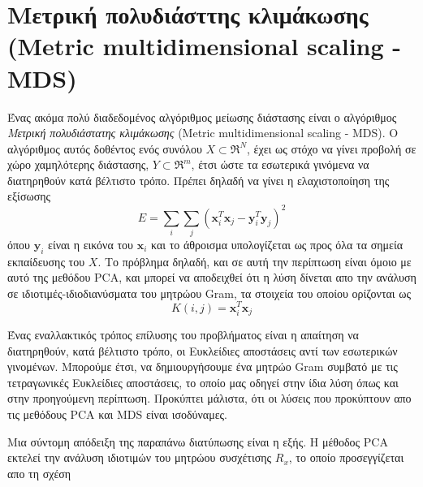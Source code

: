 \section{Μετρική πολυδιάσττης κλιμάκωσης (\textlatin{Metric multidimensional scaling - MDS})}
\par
Ένας ακόμα πολύ διαδεδομένος αλγόριθμος μείωσης διάστασης είναι ο αλγόριθμος \textit{Μετρική πολυδιάστατης κλιμάκωσης} (\textlatin{Metric multidimensional scaling - MDS}). Ο αλγόριθμος αυτός δοθέντος ενός συνόλου $Χ\subset\Re^{N}$, έχει ως στόχο να γίνει προβολή σε χώρο χαμηλότερης διάστασης, $Y\subset\Re^{m}$, έτσι ώστε τα εσωτερικά γινόμενα να διατηρηθούν κατά βέλτιστο τρόπο. Πρέπει δηλαδή να γίνει η ελαχιστοποίηση της εξίσωσης
\newline\hspace*{\fill}
\begin{equation}
        E = \sum_{i} \sum_{j} (\mathbf{x}_{i}^{T}\mathbf{x}_{j}-\mathbf{y}_{i}^{T}\mathbf{y}_{j})^{2}
\end{equation}
\hspace*{\fill}\newline
όπου $\mathbf{y}_{i}$ είναι η εικόνα του $\mathbf{x}_{i}$ και το άθροισμα υπολογίζεται ως προς όλα τα σημεία εκπαίδευσης του $X$. Το πρόβλημα δηλαδή, και σε αυτή την περίπτωση είναι όμοιο με αυτό της μεθόδου \textlatin{PCA}, και μπορεί να αποδειχθεί ότι η λύση δίνεται απο την ανάλυση σε ιδιοτιμές-ιδιοδιανύσματα του μητρώου \textlatin{Gram}, τα στοιχεία του οποίου ορίζονται ως 
\newline\hspace*{\fill}
\begin{equation}
        K(i,j) = \mathbf{x}_{i}^{T}\mathbf{x}_{j}
\end{equation}
\hspace*{\fill}\newline
\par
Ένας εναλλακτικός τρόπος επίλυσης του προβλήματος είναι η απαίτηση να διατηρηθούν, κατά βέλτιστο τρόπο, οι Ευκλείδιες αποστάσεις αντί των εσωτερικών γινομένων. Μπορούμε έτσι, να δημιουργήσουμε ένα μητρώο \textlatin{Gram} συμβατό με τις τετραγωνικές Ευκλείδιες αποστάσεις, το οποίο μας οδηγεί στην ίδια λύση όπως και στην προηγούμενη περίπτωση. Προκύπτει μάλιστα, ότι οι λύσεις που προκύπτουν απο τις μεθόδους \textlatin{PCA} και \textlatin{MDS} είναι ισοδύναμες.
\par
Μια σύντομη απόδειξη της παραπάνω διατύπωσης είναι η εξής. Η μέθοδος \textlatin{PCA} εκτελεί την ανάλυση ιδιοτιμών του μητρώου συσχέτισης $R_{x}$, το οποίο προσεγγίζεται απο τη σχέση
